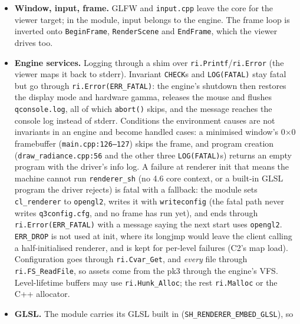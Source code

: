 \documentclass[11pt,a4paper]{article}
\begin{document}
\begin{itemize}
  checks for 4.6. No engine translation unit includes \texttt{glad.h}; the glue includes only an
  Eigen-free facade header, \texttt{engine\_api.h}, which also hands it the built-in GLSL
  (\texttt{ShEmbeddedReader}), and \texttt{sdl\_glimp.c} keeps its own \texttt{qgl*} pointers.
  With a request, \texttt{sdl\_glimp.c} skips its hardware-gamma probe
  (\texttt{SDL\_SetWindowBrightness}, which itself sets a ramp), so no ramp is ever set.
\item \textbf{Window, input, frame.} GLFW and \texttt{input.cpp} leave the core for the viewer
  target; in the module, input belongs to the engine. The frame loop is inverted onto
  \texttt{BeginFrame}, \texttt{RenderScene} and \texttt{EndFrame}, which the viewer drives too.
\item \textbf{Engine services.} Logging through a shim over \texttt{ri.Printf}/\texttt{ri.Error}
  (the viewer maps it back to stderr). Invariant \texttt{CHECK}s and \texttt{LOG(FATAL)} stay fatal
  but go through \texttt{ri.Error(ERR\_FATAL)}: the engine's shutdown then restores the display mode
  and hardware gamma, releases the mouse and flushes \texttt{qconsole.log}, all of which
  \texttt{abort()} skips, and the message reaches the console log instead of stderr. Conditions the
  environment causes are not invariants in an engine and become handled cases: a minimised
  window's 0$\times$0 framebuffer (\texttt{main.cpp:126--127}) skips the frame, and program
  creation (\texttt{draw\_radiance.cpp:56} and the other three \texttt{LOG(FATAL)}s) returns an
  empty program with the driver's info log. A failure at renderer init that means the machine
  cannot run \texttt{renderer\_sh} (no 4.6 core context, or a built-in GLSL program the driver
  rejects) is fatal with a fallback: the module sets \texttt{cl\_renderer} to \texttt{opengl2},
  writes it with \texttt{writeconfig} (the fatal path never writes \texttt{q3config.cfg}, and no
  frame has run yet), and ends through \texttt{ri.Error(ERR\_FATAL)} with a message saying the next
  start uses \texttt{opengl2}. \texttt{ERR\_DROP} is not used at init, where its longjmp would
  leave the client calling a half-initialised renderer, and is kept for per-level failures (C2's
  map load). Configuration goes through \texttt{ri.Cvar\_Get}, and \emph{every} file through
  \texttt{ri.FS\_ReadFile}, so assets come from the pk3 through the engine's VFS. Level-lifetime
  buffers may use \texttt{ri.Hunk\_Alloc}; the rest \texttt{ri.Malloc} or the C++ allocator.
\item \textbf{GLSL.} The module carries its GLSL built in (\texttt{SH\_RENDERER\_EMBED\_GLSL}), so

\end{itemize}
\end{document}

